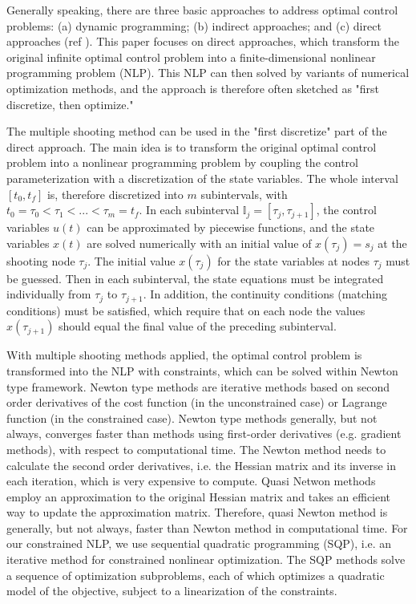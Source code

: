 \documentclass  [
  paper    = a4,
  BCOR     = 10mm,
  twoside,
  fontsize = 12pt,
  fleqn,
  toc      = bibnumbered,
  toc      = listofnumbered,
  numbers  = noendperiod,
  headings = normal,
  listof   = leveldown,
  version  = 3.03
]                                       {scrreprt}
\newcommand{\<}{\langle}
\renewcommand{\>}{\rangle}
\begin{document}
Generally speaking, there are three basic approaches to address optimal control problems: (a) dynamic programming; (b) indirect approaches; and (c) direct approaches (ref \cite{MHHP05}). This paper focuses on direct approaches, which transform the original infinite optimal control problem into a finite-dimensional nonlinear programming problem (NLP). This NLP can then solved by variants of numerical optimization methods, and the approach is therefore often sketched as "first discretize, then optimize."

The multiple shooting method can be used in the "first discretize" part of the direct approach. The main idea is to transform the original optimal control problem into a nonlinear programming problem by coupling the control parameterization with a discretization of the state variables. The whole interval $[t_0, t_f]$ is, therefore discretized into $m$ subintervals, with $t_0 = \tau_0 < \tau_1 < ... < \tau_m = t_f$. In each subinterval $\mathbb{I}_j = [\tau_{j}, \tau_{j+1}]$, the control variables $u(t)$ can be approximated by piecewise functions, and the state variables $x(t)$ are solved numerically with an initial value of $x(\tau_j)=s_j$ at the shooting node $\tau_j$. The initial value $x(\tau_j)$ for the state variables at nodes $\tau_j$ must be guessed. Then in each subinterval, the state equations must be integrated individually from $\tau_j$ to $\tau_{j+1}$. In addition, the continuity conditions (matching conditions) must be satisfied, which require that on each node the values $x(\tau_{j+1})$ should equal the final value of the preceding subinterval.

With multiple shooting methods applied, the optimal control problem is transformed into the NLP with constraints, which can be solved within Newton type framework. Newton type methods are iterative methods based on second order derivatives of the cost function (in the unconstrained case) or Lagrange function (in the constrained case). Newton type methods generally, but not always, converges faster than methods using first-order derivatives (e.g. gradient methods), with respect to computational time. The Newton method needs to calculate the second order derivatives, i.e. the Hessian matrix and its inverse in each iteration, which is very expensive to compute. Quasi Netwon methods employ an approximation to the original Hessian matrix and takes an efficient way to update the approximation matrix. Therefore, quasi Newton method is generally, but not always, faster than Newton method in computational time. For our constrained NLP, we use sequential quadratic programming (SQP), i.e. an iterative method for constrained nonlinear optimization. The SQP methods solve a sequence of optimization subproblems, each of which optimizes a quadratic model of the objective, subject to a linearization of the constraints.
\end{document}
